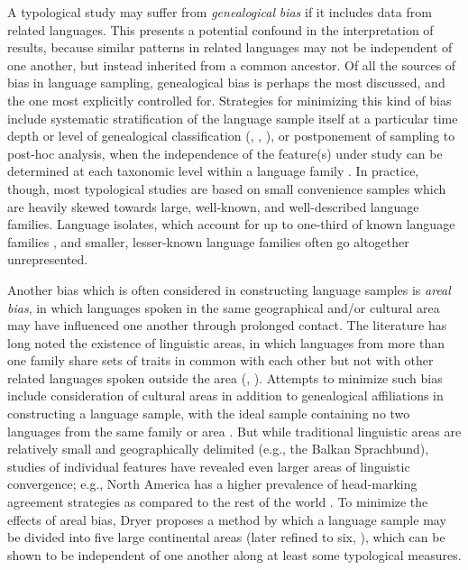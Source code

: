   A typological study may suffer from \textit{genealogical} \textit{bias} if it includes data from related languages. This presents a potential confound in the interpretation of results, because similar patterns in related languages may not be independent of one another, but instead inherited from a common ancestor. Of all the sources of bias in language sampling, genealogical bias is perhaps the most discussed, and the one most explicitly controlled for. Strategies for minimizing this kind of bias include systematic stratification of the language sample itself at a particular time depth or level of genealogical classification (\citealt{Bell1978b}, \citealt{Maddieson1984}, \citealt{Dryer1989}), or postponement of sampling to post-hoc analysis, when the independence of the feature(s) under study can be determined at each taxonomic level within a language family \citep{Bickel2008}. In practice, though, most typological studies are based on small convenience samples which are heavily skewed towards large, well-known, and well-described language families. Language isolates, which account for up to one-third of known language families \citep{Campbell2016}, and smaller, lesser-known language families often go altogether unrepresented.



  Another bias which is often considered in constructing language samples is \textit{areal} \textit{bias}, in which languages spoken in the same geographical and/or cultural area may have influenced one another through prolonged contact. The literature has long noted the existence of linguistic areas, in which languages from more than one family share sets of traits in common with each other but not with other related languages spoken outside the area (\citealt{AikhenvaldDixon2001a}, \citealt{Chirikba2008}). Attempts to minimize such bias include consideration of cultural areas in addition to genealogical affiliations in constructing a language sample, with the ideal sample containing no two languages from the same family or area \citep{Perkins1985}. But while traditional linguistic areas are relatively small and geographically delimited (e.g., the Balkan Sprachbund), studies of individual features have revealed even larger areas of linguistic convergence; e.g., North America has a higher prevalence of head-marking agreement strategies as compared to the rest of the world \citep{Dryer1989}. To minimize the effects of areal bias, Dryer proposes a method by which a language sample may be divided into five large continental areas (later refined to six, \citealt{Dryer1992}), which can be shown to be independent of one another along at least some typological measures.



